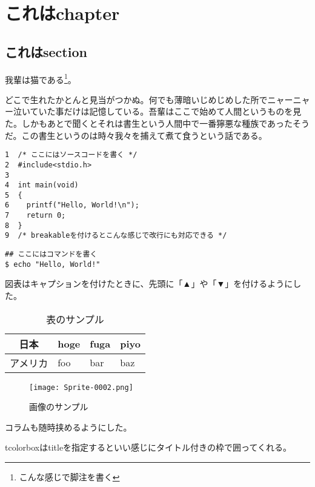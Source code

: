 \documentclass[b5paper]{ltjsbook}
\begin{document}
\chapter{これはchapter}
\section{これはsection}
我輩は猫である\footnote{こんな感じで脚注を書く}。

どこで生れたかとんと見当がつかぬ。何でも薄暗いじめじめした所でニャーニャー泣いていた事だけは記憶している。吾輩はここで始めて人間というものを見た。しかもあとで聞くとそれは書生という人間中で一番獰悪な種族であったそうだ。この書生というのは時々我々を捕えて煮て食うという話である。

\begin{tcolorbox}[breakable]
\begin{verbatim}
1  /* ここにはソースコードを書く */
2  #include<stdio.h>
3
4  int main(void)
5  {
6    printf("Hello, World!\n");
7    return 0;
8  }
9  /* breakableを付けるとこんな感じで改行にも対応できる */
\end{verbatim}
\end{tcolorbox}

\begin{alltt}
\begin{verbatim}
## ここにはコマンドを書く
$ echo "Hello, World!"
\end{verbatim}
\end{alltt}

図表はキャプションを付けたときに、先頭に「▲」や「▼」を付けるようにした。

\begin{table}[ht]
  \centering
  \caption{表のサンプル}
  \begin{tabular}{|c|l|l|l|} \hline
    日本 & hoge & fuga & piyo \\ \hline
    アメリカ & foo & bar & baz \\ \hline
  \end{tabular}
  \label{table-sample}
\end{table}

\begin{figure}[ht]
  \centering
  \texttt{[image: Sprite-0002.png]}
  \caption{画像のサンプル}
  \label{figure-sample}
\end{figure}

\begin{tcolorbox}[title=これはコラム]
  コラムも随時挟めるようにした。

  tcolorboxはtitleを指定するといい感じにタイトル付きの枠で囲ってくれる。
\end{tcolorbox}
\end{document}
